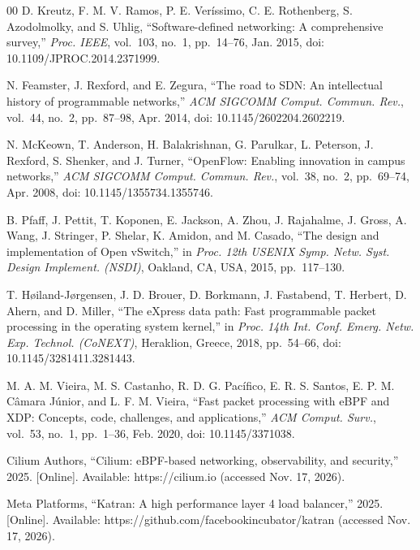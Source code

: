 \documentclass[conference]{IEEEtran}
\begin{document}


\begin{thebibliography}{00}
 D. Kreutz, F. M. V. Ramos, P. E. Ver\'issimo,
C. E. Rothenberg, S. Azodolmolky, and S. Uhlig, ``Software-defined networking:
A comprehensive survey,'' \textit{Proc. IEEE}, vol.~103, no.~1, pp.~14--76,
Jan. 2015, doi: 10.1109/JPROC.2014.2371999.

 N. Feamster, J. Rexford, and E. Zegura, ``The road
to SDN: An intellectual history of programmable networks,'' \textit{ACM
SIGCOMM Comput. Commun. Rev.}, vol.~44, no.~2, pp.~87--98, Apr. 2014,
doi: 10.1145/2602204.2602219.

 N. McKeown, T. Anderson, H. Balakrishnan,
G. Parulkar, L. Peterson, J. Rexford, S. Shenker, and J. Turner, ``OpenFlow:
Enabling innovation in campus networks,'' \textit{ACM SIGCOMM Comput. Commun.
Rev.}, vol.~38, no.~2, pp.~69--74, Apr. 2008, doi: 10.1145/1355734.1355746.

 B. Pfaff, J. Pettit, T. Koponen, E. Jackson, A. Zhou,
J. Rajahalme, J. Gross, A. Wang, J. Stringer, P. Shelar, K. Amidon, and
M. Casado, ``The design and implementation of Open vSwitch,'' in \textit{Proc.
12th USENIX Symp. Netw. Syst. Design Implement. (NSDI)}, Oakland, CA, USA,
2015, pp.~117--130.

 T. H{\o}iland-J{\o}rgensen, J. D. Brouer,
D. Borkmann, J. Fastabend, T. Herbert, D. Ahern, and D. Miller, ``The eXpress
data path: Fast programmable packet processing in the operating system
kernel,'' in \textit{Proc. 14th Int. Conf. Emerg. Netw. Exp. Technol.
(CoNEXT)}, Heraklion, Greece, 2018, pp.~54--66, doi: 10.1145/3281411.3281443.

 M. A. M. Vieira, M. S. Castanho, R. D. G. Pac\'ifico,
E. R. S. Santos, E. P. M. C\^amara J\'unior, and L. F. M. Vieira, ``Fast packet
processing with eBPF and XDP: Concepts, code, challenges, and applications,''
\textit{ACM Comput. Surv.}, vol.~53, no.~1, pp.~1--36, Feb. 2020,
doi: 10.1145/3371038.

 Cilium Authors, ``Cilium: eBPF-based networking,
observability, and security,'' 2025. [Online]. Available:
https://cilium.io (accessed Nov. 17, 2026).

 Meta Platforms, ``Katran: A high performance layer 4 load
balancer,'' 2025. [Online]. Available:
https://github.com/facebookincubator/katran (accessed Nov. 17, 2026).


\end{thebibliography}
\end{document}
